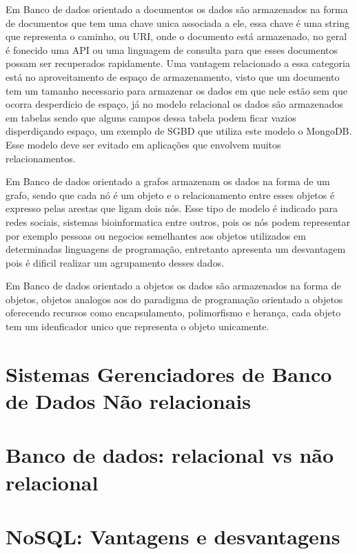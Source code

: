 \documentclass[12pt]{article}
\begin{document}
Em Banco de dados orientado a documentos os dados são armazenados na forma de documentos que tem uma chave unica associada a ele, essa chave é uma string que representa o caminho, ou URI, onde o documento está armazenado, no geral é fonecido uma API ou uma linguagem de consulta para que esses documentos possam ser recuperados rapidamente. \cite{surveyNosql:2012} Uma vantagem relacionado a essa categoria está no aproveitamento de espaço de armazenamento, visto que um documento tem um tamanho necessario para armazenar os dados em que nele estão sem que ocorra desperdicio de espaço, já no modelo relacional os dados são armazenados em tabelas sendo que alguns campos dessa tabela podem ficar vazios disperdiçando espaço, um exemplo de SGBD que utiliza este modelo o MongoDB. Esse modelo deve ser evitado em aplicações que envolvem muitos relacionamentos.\cite{typeNOSQL:2013}

Em Banco de dados orientado a grafos armazenam os dados na forma de um grafo, sendo que cada nó é um objeto e o relacionamento entre esses objetos é expresso pelas arestas que ligam dois nós. Esse tipo de modelo é indicado para redes sociais, sistemas bioinformatica entre outros, pois os nós podem representar por exemplo pessoas ou negocios semelhantes aos objetos utilizados em determinadas linguagens de programação, entretanto apresenta um desvantagem pois é dificil realizar um agrupamento desses dados.\cite{typeNOSQL:2013}\cite{surveyNosql:2012} 

Em Banco de dados orientado a objetos os dados são armazenados na forma de objetos, objetos analogos aos do paradigma de programação orientado a objetos oferecendo recursos como encapsulamento, polimorfismo e herança, cada objeto tem um idenficador unico que representa o objeto unicamente.\cite{typeNOSQL:2013}

\section{Sistemas Gerenciadores de Banco de Dados Não relacionais}

\section{Banco de dados: relacional vs não relacional}

\section{NoSQL: Vantagens e desvantagens}
\label{sec:vantagensedesvantagens}
\end{document}
